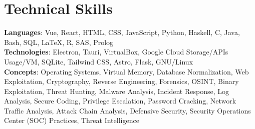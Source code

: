 \section{Technical Skills}
    \begin{itemize}[leftmargin=0.15in, label={}]
	\small{\item{
		\textbf{Languages}{: Vue, React, HTML, CSS, JavaScript, Python, Haskell, C, Java, Bash, SQL, LaTeX, R, SAS, Prolog} \\
		\textbf{Technologies}{: Electron, Tauri, VirtualBox, Google Cloud Storage/APIs Usage/VM, SQLite, Tailwind CSS, Astro, Flask, GNU/Linux} \\
		\textbf{Concepts}{: Operating Systems, Virtual Memory, Database Normalization, Web Exploitation, Cryptography, Reverse Engineering, Forensics, OSINT, Binary Exploitation, Threat Hunting, Malware Analysis, Incident Response, Log Analysis, Secure Coding, Privilege Escalation, Password Cracking, Network Traffic Analysis, Attack Chain Analysis, Defensive Security, Security Operations Center (SOC) Practices, Threat Intelligence}
	}}
    \end{itemize}
